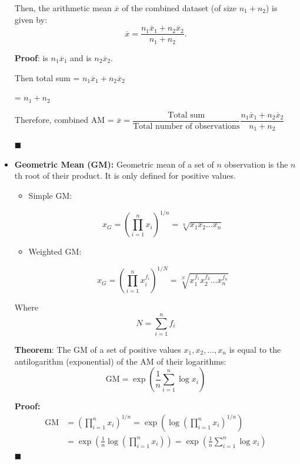 \documentclass[twoside]{book}
\begin{document}
\begin{itemize}
\begin{textbox}
Then, the arithmetic mean \( \overline{x} \) of the combined dataset (of size \( n_1 + n_2 \)) is given by:
\[
\overline{x} = \dfrac{n_1 \overline{x}_1 + n_2 \overline{x}_2}{n_1 + n_2}.
\]
\end{textbox}

\textbf{Proof}:  is $n_1 \overline{x}_1$ and  is $n_2 \overline{x}_2$.

Then total sum = $n_1 \overline{x}_1 + n_2 \overline{x}_2$

 = $n_1 + n_2$

Therefore, combined AM = $\overline{x} = \dfrac{\text{Total sum}}{\text{Total number of observations}} \dfrac{n_1 \overline{x}_1 + n_2 \overline{x}_2}{n_1 + n_2}$

\hfill $\blacksquare$

    \item \textbf{Geometric Mean (GM):} Geometric mean of a set of $n$ observation is the $n$th root of their product. It is only defined for positive values.

    \begin{itemize}
        \item Simple GM:
        \begin{textbox}
    \[
    x_G = \left( \prod_{i=1}^{n} x_i \right)^{1/n} = \sqrt[n]{x_1 x_2 \dots x_n}
    \]
    \end{textbox}
    \item Weighted GM:
    \begin{textbox}
    \[
    x_G = \left( \prod_{i=1}^{n} x_i^{f_i} \right)^{1/N} = \sqrt[N]{x_1^{f_1} x_2^{f_2} \dots x_n^{f_n}}
    \]
    \end{textbox}
    \end{itemize}
    Where $$N = \sum_{i=1}^n f_i$$

        \begin{textbox}
        \textbf{Theorem}: The GM of a set of positive values \( x_1, x_2, \dots, x_n \) is equal to the antilogarithm (exponential) of the AM of their logarithms:
\[
\mathrm{GM} = \exp\left( \frac{1}{n} \sum_{i=1}^n \log x_i \right)
\]
    \end{textbox}

\textbf{Proof:}
\begin{align*}
\mathrm{GM} &= \left( \prod_{i=1}^n x_i \right)^{1/n} = \exp\left( \log \left( \prod_{i=1}^n x_i \right)^{1/n} \right) \\
            &= \exp\left( \frac{1}{n} \log \left( \prod_{i=1}^n x_i \right) \right) = \exp\left( \frac{1}{n} \sum_{i=1}^n \log x_i \right)
\end{align*}
\hfill $\blacksquare$


\end{itemize}
\end{document}
